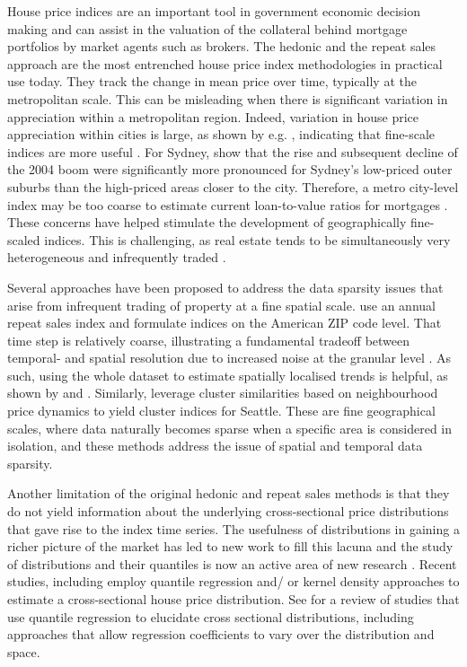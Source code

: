 House price indices are an important tool in government economic decision making and can assist in the valuation of the collateral behind mortgage portfolios by market agents such as brokers.
The hedonic and the repeat sales approach are the most entrenched house price index methodologies in practical use today. They track the change in mean price over time, typically at the metropolitan scale. This can be misleading when there is significant variation in appreciation within a metropolitan region. Indeed, variation in house price appreciation within cities is large, as shown by e.g. \citet{guerrieri_et_al2013, bogin_et_al2019,landvoigt_et_al2015}, indicating that fine-scale indices are more useful \citep[e.g.][]{ constantinescu_francke2013, bogin_et_al2019, ren_et_al2017, waltl2019}.  For Sydney, \citet{waltl2019} show that the rise and subsequent decline of the 2004 boom were significantly more pronounced for Sydney's low-priced outer suburbs than the high-priced areas closer to the city.  Therefore, a metro city-level index may be too coarse to estimate current loan-to-value ratios for mortgages \citep{bogin_et_al2019}. These concerns have helped stimulate the development of geographically fine-scaled indices. This is challenging, as real estate tends to be simultaneously very heterogeneous and infrequently traded \citep{deng_et_al2012}.

Several approaches have been proposed to address the data sparsity issues that arise from infrequent trading of property at a fine spatial scale. \cite{bogin_et_al2019} use an annual repeat sales index and formulate indices on the American ZIP code level. That time step is relatively coarse, illustrating a fundamental tradeoff between temporal- and spatial resolution due to increased noise at the granular level \citep{geltner_ling2006}. 
 As such, using the whole dataset to estimate spatially localised trends is helpful, as shown by \citet{francke_devos2000} and \cite{francke_minne2017}. 
 Similarly, \cite{ren_et_al2017} leverage cluster similarities based on neighbourhood price dynamics to yield cluster indices for Seattle. These are fine geographical scales, where data naturally becomes sparse when a specific area is considered in isolation, and these methods address the issue of spatial and temporal data sparsity.

Another limitation of the original hedonic and repeat sales methods is that they do not yield information about the underlying cross-sectional price distributions that gave rise to the index time series. The usefulness of distributions in gaining a richer picture of the market has led to new work to fill this lacuna and the study of distributions and their quantiles is now an active area of new research \citep{waltl2019, nicodemo_raya2012}. Recent studies, including \citet{coulson_mcmillen2007, deng_et_al2012, mcmillen2008, mcmillen_shimizu2021, waltl2019,nicodemo_raya2012} employ quantile regression and/ or kernel density approaches to estimate a cross-sectional house price distribution. See \cite{waltl2019} for a review of studies that use quantile regression to elucidate cross sectional distributions, including approaches that allow regression coefficients to vary over the distribution and space. 

